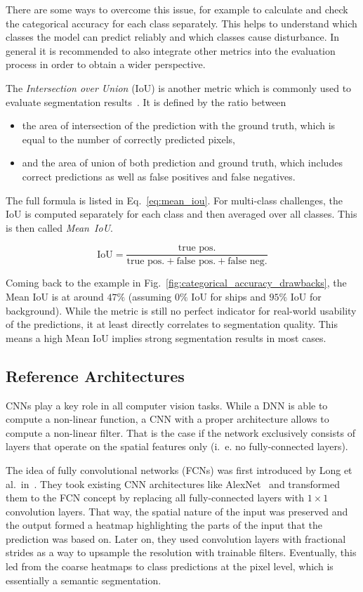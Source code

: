 There are some ways to overcome this issue, for example to calculate and check the categorical accuracy for each class separately. This helps to understand which classes the model can predict reliably and which classes cause disturbance. In general it is recommended to also integrate other metrics into the evaluation process in order to obtain a wider perspective.

The \emph{Intersection over Union} (IoU) is another metric which is commonly used to evaluate segmentation results~\cite{pascal_voc15}. It is defined by the ratio between
\begin{itemize}
    \item the area of intersection of the prediction with the ground truth, which is equal to the number of correctly predicted pixels,
    \item and the area of union of both prediction and ground truth, which includes correct predictions as well as false positives and false negatives.
\end{itemize}
The full formula is listed in Eq.~\ref{eq:mean_iou}. For multi-class challenges, the IoU is computed separately for each class and then averaged over all classes. This is then called \emph{Mean~IoU}.

\begin{equation}
    \label{eq:mean_iou}
    \text{IoU} = \frac{\text{true pos.}}{\text{true pos.}+\text{false pos.}+\text{false neg.}}
\end{equation}

Coming back to the example in Fig.~\ref{fig:categorical_accuracy_drawbacks}, the Mean IoU is at around $47\%$ (assuming $0\%$ IoU for ships and $95\%$ IoU for background). While the metric is still no perfect indicator for real-world usability of the predictions, it at least directly correlates to segmentation quality. This means a high Mean IoU implies strong segmentation results in most cases.

\subsection{Reference Architectures}
\label{sec:ref_archs}
CNNs play a key role in all computer vision tasks. While a DNN is able to compute a non-linear function, a CNN with a proper architecture allows to compute a non-linear filter. That is the case if the network exclusively consists of layers that operate on the spatial features only (i.~e. no fully-connected layers).

The idea of fully convolutional networks (FCNs) was first introduced by Long et al.\ in~\cite{fcn15}. They took existing CNN architectures like AlexNet~\cite{alexnet12} and transformed them to the FCN concept by replacing all fully-connected layers with $1\times 1$ convolution layers. That way, the spatial nature of the input was preserved and the output formed a heatmap highlighting the parts of the input that the prediction was based on. Later on, they used convolution layers with fractional strides as a way to upsample the resolution with trainable filters. Eventually, this led from the coarse heatmaps to class predictions at the pixel level, which is essentially a semantic segmentation.

